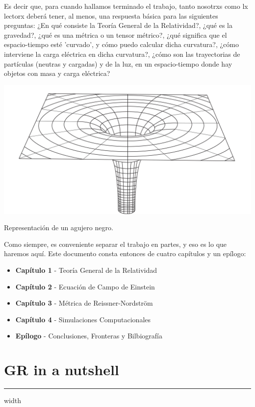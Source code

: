 Es decir que, para cuando hallamos terminado el trabajo, tanto nosotrxs como lx lectorx deberá tener, al menos, una respuesta básica para las siguientes preguntas: ¿En qué consiste la Teoría General de la Relatividad?, ¿qué es la gravedad?, ¿qué es una métrica o un tensor métrico?, ¿qué significa que el espacio-tiempo esté 'curvado', y cómo puedo calcular dicha curvatura?, ¿cómo interviene la carga eléctrica en dicha curvatura?, ¿cómo son las trayectorias de partículas (neutras y cargadas) y de la luz, en un espacio-tiempo donde hay objetos con masa y carga eléctrica?
\begin{marginfigure}
\captionsetup{type=figure}
    \centering
    \includegraphics[width=1.3\textwidth]{Im/27c518672e8aa2b372107cca7726603f.jpg}
    \caption{Representación de un agujero negro.}
    \label{fig:sen}
\end{marginfigure}
Como siempre, es conveniente separar el trabajo en partes, y eso es lo que haremos aquí. Este documento consta entonces de cuatro capítulos y un epílogo:

\begin{remarkbox}{}
\begin{itemize}
    \item \textbf{Capítulo 1} - Teoría General de la Relatividad
    \item \textbf{Capítulo 2} - Ecuación de Campo de Einstein
    \item \textbf{Capítulo 3} - Métrica de Reissner-Nordström
    \item \textbf{Capítulo 4} - Simulaciones Computacionales
    \item \textbf{Epílogo} - Conclusiones, Fronteras y Bilbiografía
\end{itemize}
\end{remarkbox}

\section{\huge{GR in a nutshell}}
\textcolor{myred}{\hrule width\textwidth}

